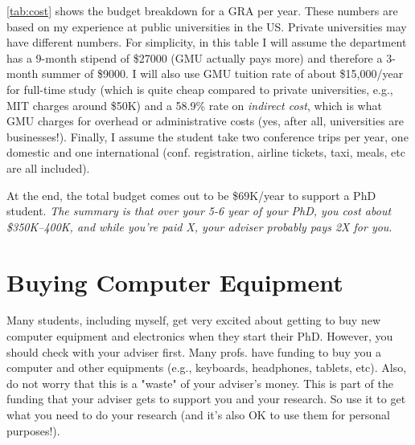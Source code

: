 \documentclass[oneside,11pt]{memoir}
\newcommand{\mycomment}[3][\color{blue}]{{#1{{#2}: {#3}}}}
\newcommand{\tvn}[1]{\mycomment{TVN}{#1}}{}
\begin{document}
\autoref{tab:cost} shows the budget breakdown for a GRA per year.
These numbers are based on my experience at public universities in the US.  Private universities may have different numbers.  For simplicity, in this table I will assume the department has a 9-month stipend of \$27000 (GMU actually pays more) and therefore a 3-month summer of \$9000. I will also use GMU tuition rate of about \$15,000/year for full-time study (which is quite cheap compared to private universities, e.g., MIT charges around \$50K) and a 58.9\% rate on \emph{indirect cost}, which is what GMU charges for overhead or administrative costs (yes, after all, universities are businesses!).  Finally, I assume the student take two conference trips per year, one domestic and one international (conf. registration, airline tickets, taxi, meals, etc are all included). 

At the end, the total budget comes out to be \$69K/year to support a PhD student. \emph{The summary is that over your 5-6 year of your PhD, you cost about \$350K--400K, and while you're paid X, your adviser probably pays 2X for you}.  





\section{Buying Computer Equipment}\label{sec:buying-equipment} Many students, including myself, get very excited about getting to buy new computer equipment and electronics when they start their PhD. However, you should check with your adviser first.  Many profs. have funding to buy you a computer and other equipments (e.g., keyboards, headphones, tablets, etc).  Also, do not worry that this is a "waste" of your adviser's money.  This is part of the funding that your adviser gets to support you and your research.  So use it to get what you need to do your research (and it's also OK to use them for personal purposes!).
\end{document}
